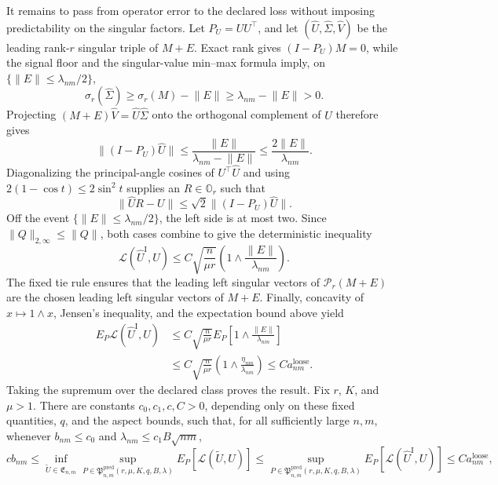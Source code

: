 It remains to pass from operator error to the declared loss without imposing predictability on the singular factors.  Let \(P_U=UU^\top\), and let \((\widehat U,\widehat\Sigma,\widehat V)\) be the leading rank-\(r\) singular triple of \(M+E\).  Exact rank gives \((I-P_U)M=0\), while the signal floor and the singular-value min--max formula imply, on \(\{\lVert E\rVert\le\lambda_{nm}/2\}\),
\[
 \sigma_r(\widehat\Sigma)
 \ge\sigma_r(M)-\lVert E\rVert
 \ge\lambda_{nm}-\lVert E\rVert>0.
\]
Projecting \((M+E)\widehat V=\widehat U\widehat\Sigma\) onto the orthogonal complement of \(U\) therefore gives
\[
 \lVert(I-P_U)\widehat U\rVert
 \le\frac{\lVert E\rVert}{\lambda_{nm}-\lVert E\rVert}
 \le\frac{2\lVert E\rVert}{\lambda_{nm}}.
\]
Diagonalizing the principal-angle cosines of \(U^\top\widehat U\) and using
\(2(1-\cos t)\le2\sin^2t\) supplies an \(R\in\mathbb O_r\) such that
\[
 \lVert\widehat UR-U\rVert
 \le\sqrt2\lVert(I-P_U)\widehat U\rVert.
\]
Off the event \(\{\lVert E\rVert\le\lambda_{nm}/2\}\), the left side is at most two.  Since \(\lVert Q\rVert_{2,\infty}\le\lVert Q\rVert\), both cases combine to give the deterministic inequality
\[
 \mathcal L(\widehat U^{\mathrm I},U)
 \le C\sqrt{\frac n{\mu r}}
 \left(1\wedge\frac{\lVert E\rVert}{\lambda_{nm}}\right).
\]
The fixed tie rule ensures that the leading left singular vectors of \(\mathcal P_r(M+E)\) are the chosen leading left singular vectors of \(M+E\).  Finally, concavity of \(x\mapsto1\wedge x\), Jensen's inequality, and the expectation bound above yield
\[
 \begin{aligned}
 E_P\mathcal L(\widehat U^{\mathrm I},U)
 &\le C\sqrt{\frac n{\mu r}}
 E_P\left[1\wedge\frac{\lVert E\rVert}{\lambda_{nm}}\right]\\
 &\le C\sqrt{\frac n{\mu r}}
 \left(1\wedge\frac{\eta_{nm}}{\lambda_{nm}}\right)
 \le C a^{\mathrm{loose}}_{nm}.
 \end{aligned}
\]
Taking the supremum over the declared class proves the result.
Fix \(r\), \(K\), and \(\mu>1\).  There are constants \(c_0,c_1,c,C>0\), depending only on these fixed quantities, \(q\), and the aspect bounds, such that, for all sufficiently large \(n,m\), whenever \(b_{nm}\le c_0\) and \(\lambda_{nm}\le c_1B\sqrt{nm}\),
\[
 c b_{nm}\le
 \inf_{\widetilde U\in\mathfrak E_{n,m}}
 \sup_{P\in\mathfrak P^{\mathrm{pred}}_{n,m}(r,\mu,K,q,B,\lambda)}
 E_P[\mathcal L(\widetilde U,U)]
 \le
 \sup_{P\in\mathfrak P^{\mathrm{pred}}_{n,m}(r,\mu,K,q,B,\lambda)}
 E_P[\mathcal L(\widehat U^{\mathrm I},U)]
 \le C a^{\mathrm{loose}}_{nm},
\]
